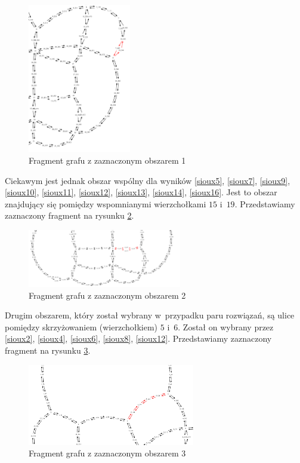 \documentclass[twoside,12pt]{report}
\begin{document}
\begin{figure}[ht]
\centering
\includegraphics[width=0.4\textwidth, angle=90]{img/sioux-out/obszar1}
\caption{Fragment grafu z zaznaczonym obszarem 1}
\label{frag_1}
\end{figure}

Ciekawym jest jednak obszar wspólny dla wyników \ref{sioux5}, \ref{sioux7}, \ref{sioux9}, \ref{sioux10}, \ref{sioux11}, \ref{sioux12}, \ref{sioux13}, \ref{sioux14}, \ref{sioux16}. Jest to obszar znajdujący się pomiędzy wspomnianymi wierzchołkami $15$ i~$19$. Przedstawiamy zaznaczony fragment na rysunku \ref{frag_2}.

\begin{figure}[ht]
\centering
\includegraphics[width=0.60\textwidth]{img/sioux-out/obszar2}
\caption{Fragment grafu z zaznaczonym obszarem 2}
\label{frag_2}
\end{figure}

Drugim obszarem, który został wybrany w~przypadku paru rozwiązań, są ulice pomiędzy skrzyżowaniem (wierzchołkiem) $5$ i~$6$. Został on wybrany przez \ref{sioux2}, \ref{sioux4}, \ref{sioux6}, \ref{sioux8}, \ref{sioux12}. Przedstawiamy zaznaczony fragment na rysunku \ref{frag_3}.

\begin{figure}[ht]
\centering
\includegraphics[width=0.65\textwidth]{img/sioux-out/obszar3}
\caption{Fragment grafu z zaznaczonym obszarem 3}
\label{frag_3}
\end{figure}
\end{document}
